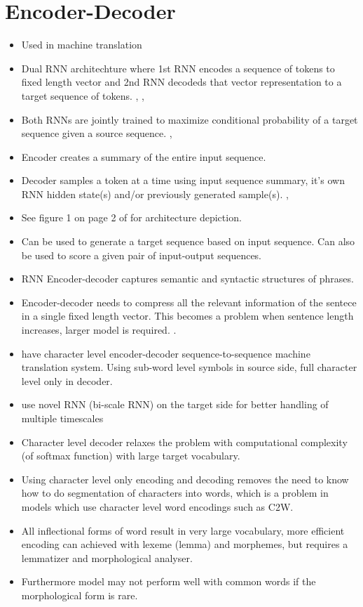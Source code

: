 \documentclass[12pt,a4paper,english
]{tutthesis}
\begin{document}
\section{Encoder-Decoder}
\begin{itemize}
\item Used in machine translation \cite{Chung2016}
\item Dual RNN architechture where 1st RNN encodes a sequence of tokens to fixed length vector and 2nd RNN decodeds that vector representation to a target sequence of tokens. \cite{Cho2014}, \cite{Bahdanau2014}, \cite{Sutskever2014}
\item Both RNNs are jointly trained to maximize conditional probability of a target sequence given a source sequence. \cite{Cho2014}, \cite{Bahdanau2014}
\item Encoder creates a summary of the entire input sequence. \cite{Cho2014}
\item Decoder samples a token at a time using input sequence summary, it's own RNN hidden state(s) and/or previously generated sample(s). \cite{Cho2014}, \cite{Bahdanau2014}
\item See figure 1 on page 2 of \cite{Cho2014} for architecture depiction.
\item Can be used to generate a target sequence based on input sequence. Can also be used to score a given pair of input-output sequences. \cite{Cho2014}
\item RNN Encoder-decoder captures semantic and syntactic structures of phrases. \cite{Cho2014}
\item Encoder-decoder needs to compress all the relevant information of the sentece in a single fixed length vector. This becomes a problem when sentence length increases, larger model is required. \cite{Bahdanau2016}.
\item \cite{Chung2016} have character level encoder-decoder sequence-to-sequence machine translation system. Using sub-word level symbols in source side, full character level only in decoder.
\item \cite{Chung2016} use novel RNN (bi-scale RNN) on the target side for better handling of multiple timescales
\item Character level decoder relaxes the problem with computational complexity (of softmax function) with large target vocabulary.
\item Using character level only encoding and decoding removes the need to know how to do segmentation of characters into words, which is a problem in models which use character level word encodings such as C2W. \cite{Chung2016}
\item All inflectional forms of word result in very large vocabulary, more efficient encoding can achieved with lexeme (lemma) and morphemes, but requires a lemmatizer and morphological analyser. \cite{Chung2016}
\item Furthermore model may not perform well with common words if the morphological form is rare. \cite{Chung2016}
\end{itemize}
\end{document}
